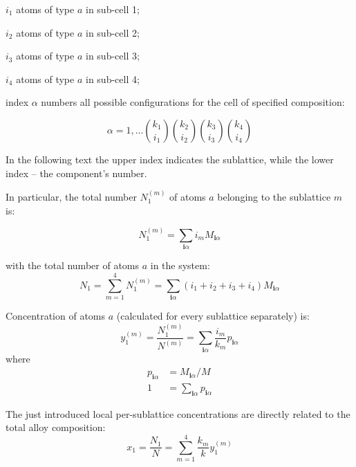 \documentclass[12pt,abstract]{scrartcl}
\begin{document}
$i_1$ atoms of type $a$ in  sub-cell 1;

$i_2$ atoms of type $a$ in  sub-cell 2;

$i_3$ atoms of type $a$ in  sub-cell 3;

$i_4$ atoms of type $a$ in  sub-cell 4;

index $\alpha$  numbers all possible configurations for the cell of specified composition:

 
\begin{equation} \label{alpha3}
\alpha = 1, \dots \binom{k_1}{i_1} \binom{k_2}{i_2} \binom{k_3}{i_3} \binom{k_4}{i_4}
\end{equation}

In the following text the upper index indicates the sublattice, while the lower index --  the  component's number.

In  particular, the total number $N_1^{(m)} $ of atoms $a$ belonging to the  sublattice $m$ is:

\begin{equation} \label{N113}
N_1^{(m)} = \sum_{\mathbf{i} \alpha} i_m M_{\mathbf{i} \alpha}
\end{equation}

with the total number of atoms $a$ in the system:
\begin{equation} \label{N13}
N_1 = \sum_{m=1}^4 N_1^{(m)}  = \sum_{\mathbf{i} \alpha} (i_1 + i_2 + i_3 + i_4) M_{\mathbf{i} \alpha}
\end{equation}


Concentration of atoms $a$  (calculated for every sublattice separately) is:
\begin{equation} \label{y12}
y_1^{(m)} = \frac{N_1^{(m)}}{N^{(m)}} = \sum_{\mathbf{i} \alpha} \frac{i_m}{k_m} p_{\mathbf{i} \alpha}
\end{equation}
where
\begin{equation} \label{pM3}
\begin{split}
 p_{\mathbf{i}\alpha} & =  M_{\mathbf{i} \alpha} / M\\
1 &=  \sum_{\mathbf{i} \alpha} p_{\mathbf{i} \alpha} 
\end{split}
\end{equation}

The just introduced  local per-sublattice concentrations are directly related to the total alloy composition:
\begin{equation} \label{x13}
x_1 = \frac{N_1}{N} = \sum_{m=1}^4 \frac{k_m}{k} y_1^{(m)} 
\end{equation}
\end{document}
